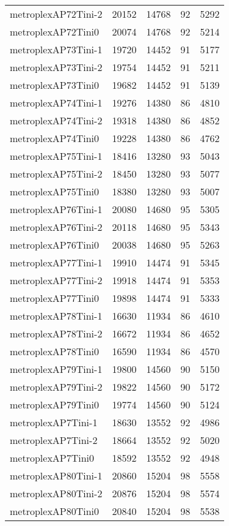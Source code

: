 \begin{longtable}{lrrrr}
metroplexAP72Tini-2 & 20152 & 14768 & 92 & 5292 \\
metroplexAP72Tini0 & 20074 & 14768 & 92 & 5214 \\
metroplexAP73Tini-1 & 19720 & 14452 & 91 & 5177 \\
metroplexAP73Tini-2 & 19754 & 14452 & 91 & 5211 \\
metroplexAP73Tini0 & 19682 & 14452 & 91 & 5139 \\
metroplexAP74Tini-1 & 19276 & 14380 & 86 & 4810 \\
metroplexAP74Tini-2 & 19318 & 14380 & 86 & 4852 \\
metroplexAP74Tini0 & 19228 & 14380 & 86 & 4762 \\
metroplexAP75Tini-1 & 18416 & 13280 & 93 & 5043 \\
metroplexAP75Tini-2 & 18450 & 13280 & 93 & 5077 \\
metroplexAP75Tini0 & 18380 & 13280 & 93 & 5007 \\
metroplexAP76Tini-1 & 20080 & 14680 & 95 & 5305 \\
metroplexAP76Tini-2 & 20118 & 14680 & 95 & 5343 \\
metroplexAP76Tini0 & 20038 & 14680 & 95 & 5263 \\
metroplexAP77Tini-1 & 19910 & 14474 & 91 & 5345 \\
metroplexAP77Tini-2 & 19918 & 14474 & 91 & 5353 \\
metroplexAP77Tini0 & 19898 & 14474 & 91 & 5333 \\
metroplexAP78Tini-1 & 16630 & 11934 & 86 & 4610 \\
metroplexAP78Tini-2 & 16672 & 11934 & 86 & 4652 \\
metroplexAP78Tini0 & 16590 & 11934 & 86 & 4570 \\
metroplexAP79Tini-1 & 19800 & 14560 & 90 & 5150 \\
metroplexAP79Tini-2 & 19822 & 14560 & 90 & 5172 \\
metroplexAP79Tini0 & 19774 & 14560 & 90 & 5124 \\
metroplexAP7Tini-1 & 18630 & 13552 & 92 & 4986 \\
metroplexAP7Tini-2 & 18664 & 13552 & 92 & 5020 \\
metroplexAP7Tini0 & 18592 & 13552 & 92 & 4948 \\
metroplexAP80Tini-1 & 20860 & 15204 & 98 & 5558 \\
metroplexAP80Tini-2 & 20876 & 15204 & 98 & 5574 \\
metroplexAP80Tini0 & 20840 & 15204 & 98 & 5538 \\

\end{longtable}
